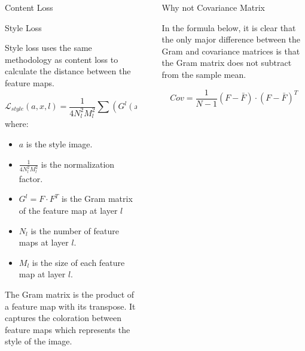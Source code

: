 \documentclass[final]{beamer}
\newlength{\sepwidth}
\newlength{\colwidth}
\newcommand{\separatorcolumn}{\begin{column}{\sepwidth}\end{column}}
\begin{document}
\begin{frame}[t]
\begin{columns}[t]
\begin{column}{\colwidth}
\begin{block}{Content Loss}
  \end{block}

  \begin{block}{Style Loss}

    Style loss uses the same methodology as content loss to calculate the distance between the feature maps.
    
    $$\mathcal{L}_{style}(a, x, l) = \frac{1}{4 N^2_l M^2_l} \sum (G^l(x) - G^l(a))^2 $$
    where:
    \begin{itemize}
        \item $a$ is the style image.
        \item $\frac{1}{4 N^2_l M^2_l}$ is the normalization factor.
        \item $G^l = F \cdot F^T$ is the Gram matrix of the feature map at layer $l$
        \item $N_l$ is the number of feature maps at layer $l$.
        \item $M_l$ is the size of each feature map at layer $l$.
    \end{itemize}

    The Gram matrix is the product of a feature map with its transpose. It captures the coloration between feature maps which represents the style of the image.

  \end{block}

\end{column}

\separatorcolumn

\begin{column}{\colwidth}

  \begin{alertblock}{Why not Covariance Matrix}

    In the formula below, it is clear that the only major difference between the Gram and covariance matrices is that the Gram matrix does not subtract from the sample mean.
    
    $$Cov = \frac{1}{N-1} (F-\bar{F})\cdot(F-\bar{F})^T$$


\end{alertblock}
\end{column}
\end{columns}
\end{frame}
\end{document}
